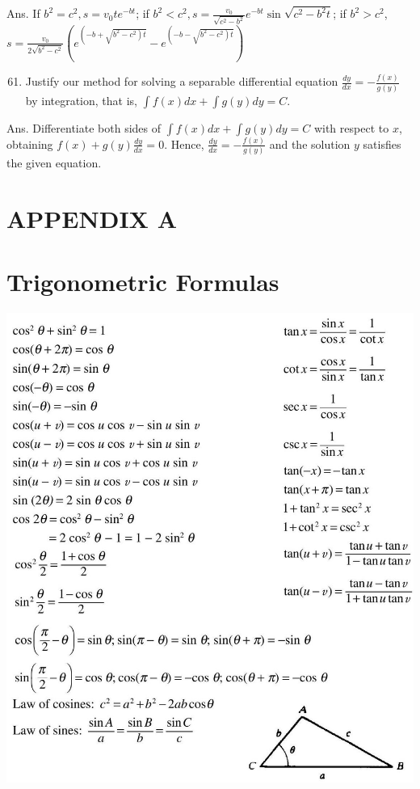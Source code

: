 \documentclass[10pt]{article}
\begin{document}
Ans. If $b^{2}=c^{2}, s=v_{0} t e^{-b t}$; if $b^{2}<c^{2}, s=\frac{v_{0}}{\sqrt{c^{2}-b^{2}}} e^{-b t} \sin \sqrt{c^{2}-b^{2} t}$; if $b^{2}>c^{2}$, $s=\frac{v_{0}}{2 \sqrt{b^{2}-c^{2}}}\left(e^{\left(-b+\sqrt{\left.b^{2}-c^{2}\right) t}\right.}-e^{\left(-b-\sqrt{\left.b^{2}-c^{2}\right) t}\right.}\right)$

\begin{enumerate}
  \setcounter{enumi}{60}
  \item Justify our method for solving a separable differential equation $\frac{d y}{d x}=-\frac{f(x)}{g(y)}$ by integration, that is, $\int f(x) d x+\int g(y) d y=C$.
\end{enumerate}

Ans. Differentiate both sides of $\int f(x) d x+\int g(y) d y=C$ with respect to $x$, obtaining $f(x)+g(y) \frac{d y}{d x}=0$. Hence, $\frac{d y}{d x}=-\frac{f(x)}{g(y)}$ and the solution $y$ satisfies the given equation.

\section*{APPENDIX A}
\section*{Trigonometric Formulas}
\begin{center}
\includegraphics[max width=\textwidth]{2024_04_20_fe2e8e718cc0fcd63d1bg-29}
\end{center}
\end{document}
